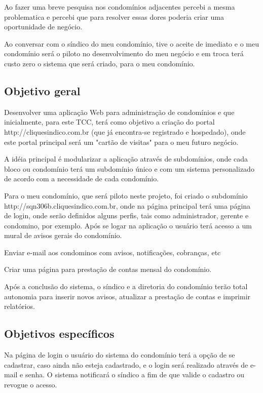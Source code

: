 Ao fazer uma breve pesquisa nos condomínios adjacentes percebi a mesma
problematica e percebi que para resolver essas dores poderia criar uma
oportunidade de negócio.

Ao conversar com o síndico do meu condomínio, tive o aceite de imediato e o 
meu condomínio será o piloto no desenvolvimento do meu negócio e em troca terá
custo zero o sistema que será criado, para o meu condomínio.

\subsection{Objetivo geral}
Desenvolver uma aplicação Web para administração de condomínios e que
inicialmente, para este TCC, terá como objetivo a criação do portal 
http://cliquesindico.com.br (que já encontra-se registrado e hospedado), onde
este portal principal será um "cartão de visitas" para o meu futuro negócio.

A idéia principal é modularizar a aplicação através de subdomínios, onde cada 
bloco ou condomínio terá um subdomínio único e com um sistema personalizado
de acordo com a necessidade de cada condomínio.

Para o meu condomínio, que será piloto neste projeto, foi criado o subdomínio
http://sqn306b.cliquesindico.com.br, onde na página principal terá uma página
de login, onde serão definidos alguns perfis, tais como administrador, gerente e
condomino, por exemplo. Após se logar na aplicação o usuário terá acesso a um
mural de avisos gerais do condomínio.

Enviar e-mail aos condominos com avisos, notificações, cobranças, etc

Criar uma página para prestação de contas mensal do condomínio.

Após a conclusão do sistema, o síndico e a diretoria do condomínio terão total
autonomia para inserir novos avisos, atualizar a prestação de contas e imprimir
relatórios.

\subsection{Objetivos específicos}
Na página de login o usuário do sistema do condomínio terá a opção de se 
cadastrar, caso ainda não esteja cadastrado, e o login será realizado através
de e-mail e senha. O sistema notificará o síndico a fim de que valide o
cadastro ou revogue o acesso.

